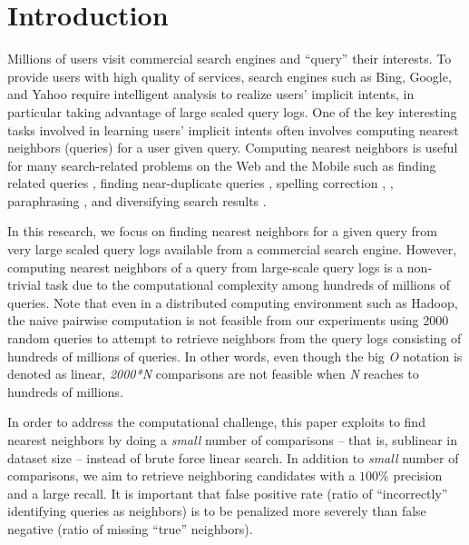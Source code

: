 
 \section{Introduction}
Millions of users visit commercial search engines and ``query'' 
their interests. To provide users with high quality of services, 
search engines such as Bing, Google, and Yahoo require
intelligent analysis to realize users' implicit intents, in particular taking
advantage of large scaled query logs.  One of the key
interesting tasks involved in learning users' implicit intents often involves 
computing nearest neighbors (queries) for a user given query. 
Computing nearest neighbors is useful for 
many search-related problems on the Web and the Mobile such as 
finding related queries \cite{Jones06WWW,Jain11SIGIR,Song12WSDM}, 
finding near-duplicate queries \cite{}, spelling correction \cite{},  
, paraphrasing \cite{petrovicNAACL12,ganitkevitch13Paraphrase}, 
and diversifying search results \cite{Song11SIGIR}.  

In this research, we focus on finding nearest neighbors for a given query
from very large scaled query logs available from a commercial search engine. 
However, computing nearest neighbors of a query 
from large-scale query logs is a non-trivial task due to the computational complexity among hundreds of millions of  queries.
Note that even in a distributed computing environment such as Hadoop, the naive pairwise computation is not feasible from our experiments  using 2000 random queries to attempt to retrieve neighbors from the query logs consisting of hundreds of millions of queries. In other words, even though the big \textit{O} notation is denoted as linear, \textit{2000*N} comparisons are not feasible when \textit{N} reaches to hundreds of millions.

In order to address the computational challenge, this paper exploits to find nearest neighbors by doing a 
\emph{small} number of comparisons -- that is, sublinear in dataset size -- instead of brute force linear search. 
In addition to \emph{small} number of comparisons, we aim to 
retrieve neighboring candidates with a $100\%$ precision and a large recall.
It is important that false positive rate (ratio of  ``incorrectly'' identifying queries as neighbors) is to be penalized more severely than false negative (ratio of missing ``true'' neighbors).


